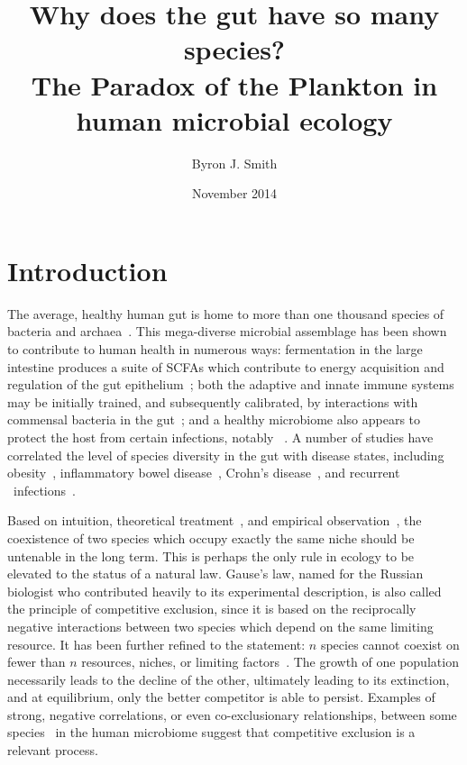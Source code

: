\documentclass[12pt]{article}
\begin{document}
\title{\huge Why does the gut have so many species? \\
       {\Large The Paradox of the Plankton in human microbial ecology}}
\author{Byron J. Smith}
\date{November 2014}
\maketitle

\section{Introduction}
The average, healthy human gut is home to more than one thousand species of
bacteria and archaea~\citep{Claesson2009,Brestoff2013}.
This mega-diverse microbial assemblage has been shown to contribute to human
health in numerous ways:
fermentation in the large intestine produces a suite of \glspl*{SCFA}
which contribute to energy acquisition and regulation of
the gut epithelium~\citep{TODO};
both the adaptive and innate immune systems may be initially trained,
and subsequently calibrated,
by interactions with commensal bacteria in the gut~\citep{TODO}; and
a healthy microbiome also appears to protect the host from certain
infections, notably \cdiff~\citep{TODO}.
A number of studies have correlated the level of species diversity in the gut
with disease states,
including obesity~\citep{TODO},
inflammatory bowel disease~\citep{TODO},
Crohn's disease~\citep{Manichanh2006},
and recurrent \cdiff\ infections~\citep{Chang2008}.

Based on intuition, theoretical
treatment~\citep{Lotka1925,Volterra1928,MacArthur1967a},
and empirical observation~\citep{Gause1932,Gause1936},
the coexistence of two species which occupy
exactly the same niche should be untenable in the long term.
This is perhaps the only rule in ecology to be elevated to the
status of a natural law.
Gause's law, named for the Russian biologist who contributed
heavily to its experimental description, is also called
the principle of competitive exclusion, since it is based on
the reciprocally negative interactions between two species which
depend on the same limiting resource.
It has been further refined to the statement: \(n\) species cannot coexist on
fewer than \(n\) resources, niches, or limiting
factors~\citep[various authors, for a review see][]{Armstrong1980}.
The growth of one population necessarily leads to the decline of
the other, ultimately leading to its extinction,
and at equilibrium, only the better competitor is able to persist.
Examples of strong, negative correlations,
or even co-exclusionary relationships,
between some species~\citep{Faust2012a} in the human microbiome
suggest that competitive exclusion is a relevant process.
\end{document}
